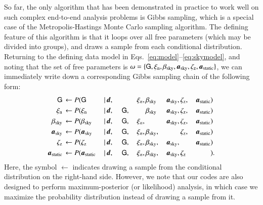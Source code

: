 \documentclass{aa}
\newcommand{\dv}[0]{\vec{d}}
\newcommand{\G}[0]{\tens{G}}
\renewcommand{\a}[0]{\vec{a}}
\begin{document}
So far, the only algorithm that has been demonstrated in practice to
work well on such complex end-to-end analysis problems is Gibbs
sampling, which is a special case of the Metropolis-Hastings Monte
Carlo sampling algorithm. The defining feature of this algorithm is
that it loops over all free parameters (which may be divided into
groups), and draws a sample from each conditional
distribution. Returning to the defining data model in
Eqs.~\eqref{eq:model}--\eqref{eq:skymodel}, and noting that the set
of free parameters is $\omega = \{\G,\xi_{\mathrm{n}},
\beta_{\mathrm{sky}},\a_{\mathrm{sky}},\zeta_{\mathrm{z}},\a_{\mathrm{static}}\}$,
we can immediately write down a corresponding Gibbs sampling chain of
the following form:
\begin{alignat}{11}
\G &\,\leftarrow P(\G&\,\mid &\,\dv,&\, &\,\phantom{\G} &\,\xi_n, &
\,\beta_{\mathrm{sky}}& \,\a_{\mathrm{sky}}, &\,\zeta_{\mathrm{z}},
&\,\a_{\mathrm{static}}&)\label{eq:gibbs_G}\\
\xi_{\mathrm{n}} &\,\leftarrow P(\xi_{\mathrm{n}}&\,\mid &\,\dv,&\, &\,\G, &\,\phantom{\xi_n} &
\,\beta_{\mathrm{sky}}& \,\a_{\mathrm{sky}}, &\,\zeta_{\mathrm{z}},
&\,\a_{\mathrm{static}}&)\\
\beta_{\mathrm{sky}} &\,\leftarrow P(\beta_{\mathrm{sky}}&\,\mid &\,\dv,&\, &\,\G, &\,\xi_n, &
\,\phantom{\beta_{\mathrm{sky}}}& \,\a_{\mathrm{sky}}, &\,\zeta_{\mathrm{z}}, &\,\a_{\mathrm{static}}&)\\
\a_{\mathrm{sky}} &\,\leftarrow P(\a_{\mathrm{sky}}&\,\mid &\,\dv,&\, &\,\G, &\,\xi_n, &
\,\beta_{\mathrm{sky}},& \,\phantom{\a_{\mathrm{sky}},}
&\,\zeta_{\mathrm{z}}, &\,\a_{\mathrm{static}}&)\\
\zeta_{\mathrm{z}} &\,\leftarrow P(\zeta_{\mathrm{z}}&\,\mid &\,\dv,&\, &\,\G, &\,\xi_n, &
\,\beta_{\mathrm{sky}},& \,\a_{\mathrm{sky}},
&\,\phantom{\zeta_{\mathrm{z}},} &\,\a_{\mathrm{static}}&)\label{eq:gibbs_zodi}\\
\a_{\mathrm{static}} &\,\leftarrow P(\a_{\mathrm{static}}&\,\mid &\,\dv,&\, &\,\G, &\,\xi_n, &
\,\beta_{\mathrm{sky}},& \,\a_{\mathrm{sky}}, &\,\zeta_{\mathrm{z}} &\,\phantom{\a_{\mathrm{static}}}&).\label{eq:gibbs_static}
\end{alignat}
Here, the symbol $\leftarrow$ indicates drawing a sample from the
conditional distribution on the right-hand side. However, we note that
our codes are also designed to perform maximum-posterior (or
likelihood) analysis, in which case we maximize the probability
distribution instead of drawing a sample from it.
\end{document}
